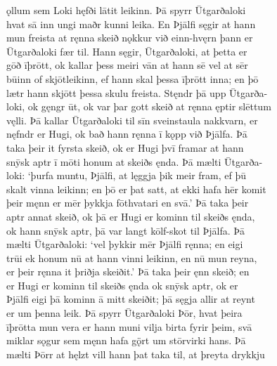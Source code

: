 \documentclass[12pt,letterpaper]{book}
\begin{document}
\begin{linenumbers}
ǫllum sem Loki hęfði lātit leikinn.  Þā spyrr Ūtgarðaloki\\
hvat sā inn ungi maðr kunni leika.  En Þjālfi sęgir at hann\\
mun freista at ręnna skeið nǫkkur við einn-hvęrn þann er\\
Ūtgarðaloki fær til.  Hann sęgir, Ūtgarðaloki, at þetta er\\
gōð īþrōtt, ok kallar þess meiri vān at hann sē vel at sēr\\
būinn of skjōtleikinn, ef hann skal þessa īþrōtt inna; en þō\\
lætr hann skjōtt þessa skulu freista.  Stęndr þā upp Ūtgarða-\\
loki, ok gęngr ūt, ok var þar gott skeið at ręnna ęptir slēttum\\
vęlli.  Þā kallar Ūtgarðaloki til sīn sveinstaula nakkvarn, er\\
nęfndr er Hugi, ok bað hann ręnna ī kǫpp við Þjālfa.  Þā\\
taka þeir it fyrsta skeið, ok er Hugi þvī framar at hann\\
snȳsk aptr ī mōti honum at skeiðs ęnda.  Þā mælti Ūtgarða-\\
loki: `þurfa muntu, Þjālfi, at lęggja þik meir fram, ef þū\\
skalt vinna leikinn; en þō er þat satt, at ekki hafa hēr komit\\
þeir męnn er mēr þykkja fōthvatari en svā.'  Þā taka þeir\\
aptr annat skeið, ok þā er Hugi er kominn til skeiðs ęnda,\\
ok hann snȳsk aptr, þā var langt kōlf-skot til Þjālfa.  Þā\\
mælti Ūtgarðaloki: `vel þykkir mēr Þjālfi ręnna; en eigi\\
trūi ek honum nū at hann vinni leikinn, en nū mun reyna,\\
er þeir ręnna it þriðja skeiðit.'  Þā taka þeir ęnn skeið; en\\
er Hugi er kominn til skeiðs ęnda ok snȳsk aptr, ok er\\
Þjālfi eigi þā kominn ā mitt skeiðit; þā sęgja allir at reynt\\
er um þenna leik.  Þā spyrr Ūtgarðaloki Þōr, hvat þeira\\
īþrōtta mun vera er hann muni vilja birta fyrir þeim, svā\\
miklar sǫgur sem męnn hafa gǫ̈rt um stōrvirki hans.  Þā\\
mælti Þōrr at hęlzt vill hann þat taka til, at þreyta drykkju\\

\end{linenumbers}
\end{document}
